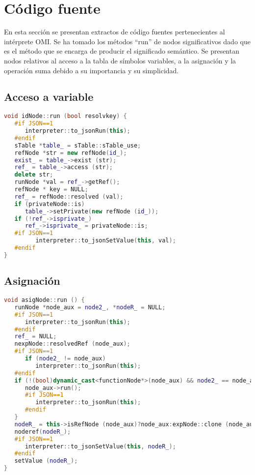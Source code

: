 \section{Código fuente}
En esta sección se presentan extractos de código fuentes pertenecientes al intérprete OMI. Se ha tomado los métodos ``run'' de nodos significativos dado que es el método que 
se encarga de producir el significado semántico. Se presentan nodos relativos al acceso a la tabla de símbolos variables, a la asignación y la operación suma debido a su importancia y su simplicidad. 

\subsection{Acceso a variable}

\begin{lstlisting}[language=cpp]
void idNode::run (bool resolvkey) {
   #if JSON==1
      interpreter::to_jsonRun(this);
   #endif
   sTable *table_ = sTable::sTable_use;
   refNode *str = new refNode(id_);
   exist_ = table_->exist (str);
   ref_ = table_->access (str);
   delete str;
   runNode *val = ref_->getRef();
   refNode * key = NULL;
   ref_ = refNode::resolved (val);
   if (privateNode::is)
      table_->setPrivate(new refNode (id_));
   if (!ref_->isprivate_)
      ref_->isprivate_ = privateNode::is;
   #if JSON==1
         interpreter::to_jsonSetValue(this, val);
   #endif
}
\end{lstlisting}

\subsection{Asignación}
\begin{lstlisting}[language=cpp]
void asigNode::run () {
   runNode *node_aux = node2_, *nodeR_ = NULL;
   #if JSON==1
      interpreter::to_jsonRun(this);
   #endif
   ref_ = NULL;
   nexpNode::resolvedRef (node_aux);
   #if JSON==1
      if (node2_ != node_aux)
         interpreter::to_jsonRun(this);
   #endif
   if (!(bool)dynamic_cast<functionNode*>(node_aux) && node2_ == node_aux) {
      node_aux->run();
      #if JSON==1
         interpreter::to_jsonRun(this);
      #endif
   }
   nodeR_ = this->isRefNode (node_aux)?node_aux:expNode::clone (node_aux);
   noderef(nodeR_);
   #if JSON==1
      interpreter::to_jsonSetValue(this, nodeR_);
   #endif
   setValue (nodeR_);
}
\end{lstlisting}
\pagebreak


